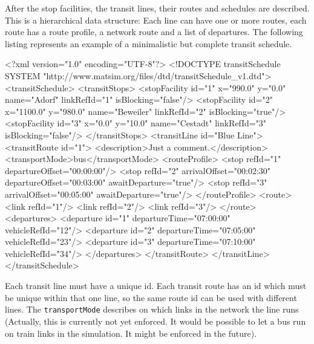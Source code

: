 After the stop facilities, the transit lines, their routes and schedules are described. This is a hierarchical data structure: Each line can have one or more routes, each route has a route profile, a network route and a list of departures. The following listing represents an example of a minimalistic but complete transit schedule.
%
\begin{xml}
<?xml version="1.0" encoding="UTF-8"?> 
<!DOCTYPE transitSchedule SYSTEM "http://www.matsim.org/files/dtd/transitSchedule_v1.dtd"> 
<transitSchedule> 
   <transitStops> 
      <stopFacility id="1" x="990.0"  y="0.0"   name="Adorf" 
           linkRefId="1" isBlocking="false"/> 
      <stopFacility id="2" x="1100.0" y="980.0" name="Beweiler" 
           linkRefId="2" isBlocking="true"/> 
      <stopFacility id="3" x="0.0"    y="10.0"  name="Cestadt" 
           linkRefId="3" isBlocking="false"/> 
   </transitStops> 
   <transitLine id="Blue Line"> 
      <transitRoute id="1"> 
         <description>Just a comment.</description> 
         <transportMode>bus</transportMode> 
         <routeProfile> 
            <stop refId="1" departureOffset="00:00:00"/> 
            <stop refId="2" arrivalOffset="00:02:30" departureOffset="00:03:00" 
                                                     awaitDeparture="true"/> 
            <stop refId="3" arrivalOffset="00:05:00" awaitDeparture="true"/> 
         </routeProfile> 
         <route> 
            <link refId="1"/> 
            <link refId="2"/> 
            <link refId="3"/> 
         </route> 
         <departures> 
            <departure id="1" departureTime="07:00:00" vehicleRefId="12"/> 
            <departure id="2" departureTime="07:05:00" vehicleRefId="23"/> 
            <departure id="3" departureTime="07:10:00" vehicleRefId="34"/> 
         </departures> 
      </transitRoute> 
   </transitLine> 
</transitSchedule>
\end{xml}

Each transit line must have a unique id. Each transit route has an id which must be unique within that one line, so the same route id can be used with different lines. The \lstinline|transportMode| describes on which links in the network the line runs (Actually, this is currently not yet enforced. It would be possible to let a bus run on train links in the simulation. It might be enforced in the future).

